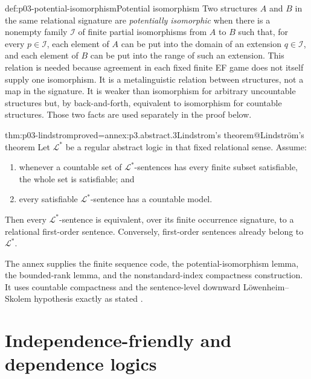 \begin{hbdefinition}{def:p03-potential-isomorphism}{Potential isomorphism}
Two structures \(A\) and \(B\) in the same relational signature are
\emph{potentially isomorphic} when there is a nonempty family \(\mathcal I\)
of finite partial isomorphisms from \(A\) to \(B\) such that, for every
\(p\in\mathcal I\), each element of \(A\) can be put into the domain of an
extension \(q\in\mathcal I\), and each element of \(B\) can be put into the
range of such an extension.  This relation is needed because agreement in
each fixed finite EF game does not itself supply one isomorphism.  It is a
metalinguistic relation between structures, not a map in the signature.  It
is weaker than isomorphism for arbitrary uncountable structures but, by
back-and-forth, equivalent to isomorphism for countable structures.  Those two
facts are used separately in the proof below.
\end{hbdefinition}

\begin{hbtheorem}{thm:p03-lindstrom}{proved=annex:p3.abstract.3}{Lindstrom's theorem@Lindstr\"om's theorem}
Let \(\mathcal L^{\ast}\) be a regular abstract logic in that fixed relational
sense.  Assume:
\begin{enumerate}
 \item whenever a countable set of \(\mathcal L^{\ast}\)-sentences has every
       finite subset satisfiable, the whole set is satisfiable; and
 \item every satisfiable \(\mathcal L^{\ast}\)-sentence has a countable model.
\end{enumerate}
Then every \(\mathcal L^{\ast}\)-sentence is equivalent, over its finite
occurrence signature, to a relational first-order sentence.  Conversely,
first-order sentences already belong to \(\mathcal L^{\ast}\).
\end{hbtheorem}

The annex supplies the finite sequence code, the potential-isomorphism lemma,
the bounded-rank lemma, and the nonstandard-index compactness construction.
It uses countable compactness and the sentence-level downward
L\"owenheim--Skolem hypothesis exactly as stated
\cite{Lindstrom1969,EbbinghausFlumThomas1994}.

\section{Independence-friendly and dependence logics}
\label{sec:p03-dependence-logics}

